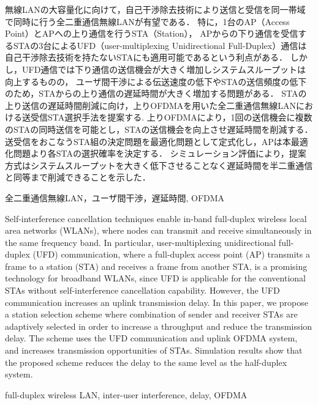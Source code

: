 \documentclass[technicalreport]{ieicej}
\begin{document}
\begin{jabstract}
	無線LANの大容量化に向けて，自己干渉除去技術により送信と受信を同一帯域で同時に行う全二重通信無線LANが有望である．
	特に，1台のAP（Access Point）とAPへの上り通信を行うSTA（Station），
	APからの下り通信を受信するSTAの3台によるUFD（user-multiplexing Unidirectional Full-Duplex）通信は自己干渉除去技術を持たないSTAにも適用可能であるという利点がある．
	しかし，UFD通信では下り通信の送信機会が大きく増加しシステムスループットは向上するものの，
	ユーザ間干渉による伝送速度の低下やSTAの送信頻度の低下のため，STAからの上り通信の遅延時間が大きく増加する問題がある．
	STAの上り送信の遅延時間削減に向け，上りOFDMAを用いた全二重通信無線LANにおける送受信STA選択手法を提案する.
	上りOFDMAにより，1回の送信機会に複数のSTAの同時送信を可能とし，STAの送信機会を向上させ遅延時間を削減する．
	送受信をおこなうSTA組の決定問題を最適化問題として定式化し，APは本最適化問題より各STAの選択確率を決定する．
	シミュレーション評価により，提案方式はシステムスループットを大きく低下させることなく遅延時間を半二重通信と同等まで削減できることを示した．
\end{jabstract}
\begin{jkeyword}
	全二重通信無線LAN，ユーザ間干渉，遅延時間, OFDMA
\end{jkeyword}
\begin{eabstract}
	Self-interference cancellation techniques enable in-band full-duplex wireless local area networks (WLANs), where nodes can  transmit and receive simultaneously in the same frequency band.
	In particular, user-multiplexing unidirectional full-duplex (UFD) communication, where a full-duplex access point (AP) transmits a frame to a station (STA) and receives a frame from another STA, is a promising technology for broadband WLANs, since UFD is applicable for the conventional STAs without self-interference cancellation capability.
	However, the UFD communication increases an uplink transmission delay.
	In this paper, we propose a station selection scheme where combination of sender and receiver STAs are adaptively selected in order to increase a throughput and reduce the transmission delay.
	The scheme uses the UFD communication and uplink OFDMA system, and increases transmission opportunities of STAs.
	Simulation results show that the proposed scheme reduces the delay to the same level as the half-duplex system.

\end{eabstract}
\begin{ekeyword}
	full-duplex wireless LAN, inter-user interference, delay, OFDMA
\end{ekeyword}
\end{document}

